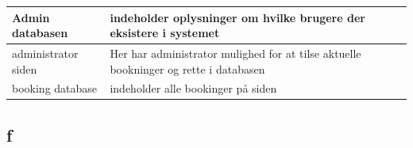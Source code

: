 \documentclass[12pt,a4paper]{article}
\begin{document}
\bigskip

\begin{minipage}{\textwidth}

 \label{tab:title}
\begin{tabular}{| p{5cm} | p{10cm} |}
\hline Admin databasen & indeholder oplysninger om hvilke brugere der eksistere i systemet \\
\hline administrator siden & Her har administrator mulighed for at tilse aktuelle bookninger og rette i databasen \\
\hline booking database & indeholder alle bookinger på siden \\
\hline
\end{tabular}

\end{minipage}

\subsection{f}
\end{document}
